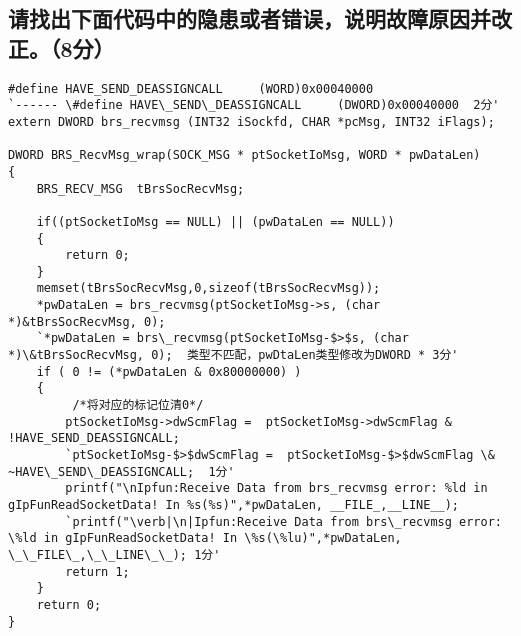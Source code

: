 ﻿\documentclass  [11pt,onecolumn,a4paper]{article}
\begin{document}
\subsection{请找出下面代码中的隐患或者错误，说明故障原因并改正。（8分）}
\begin{lstlisting}[escapeinside=`']
#define HAVE_SEND_DEASSIGNCALL     (WORD)0x00040000 
`------ \#define HAVE\_SEND\_DEASSIGNCALL     (DWORD)0x00040000  2分'
extern DWORD brs_recvmsg (INT32 iSockfd, CHAR *pcMsg, INT32 iFlags);

DWORD BRS_RecvMsg_wrap(SOCK_MSG * ptSocketIoMsg, WORD * pwDataLen)
{
    BRS_RECV_MSG  tBrsSocRecvMsg;   

    if((ptSocketIoMsg == NULL) || (pwDataLen == NULL))
    {
        return 0;
    } 
    memset(tBrsSocRecvMsg,0,sizeof(tBrsSocRecvMsg));
    *pwDataLen = brs_recvmsg(ptSocketIoMsg->s, (char *)&tBrsSocRecvMsg, 0);
    `*pwDataLen = brs\_recvmsg(ptSocketIoMsg-$>$s, (char *)\&tBrsSocRecvMsg, 0);  类型不匹配，pwDtaLen类型修改为DWORD * 3分'
    if ( 0 != (*pwDataLen & 0x80000000) )
    {
         /*将对应的标记位清0*/
        ptSocketIoMsg->dwScmFlag =  ptSocketIoMsg->dwScmFlag & !HAVE_SEND_DEASSIGNCALL;  
        `ptSocketIoMsg-$>$dwScmFlag =  ptSocketIoMsg-$>$dwScmFlag \& ~HAVE\_SEND\_DEASSIGNCALL;  1分'
        printf("\nIpfun:Receive Data from brs_recvmsg error: %ld in gIpFunReadSocketData! In %s(%s)",*pwDataLen, __FILE_,__LINE__);
        `printf("\verb|\n|Ipfun:Receive Data from brs\_recvmsg error: \%ld in gIpFunReadSocketData! In \%s(\%lu)",*pwDataLen, \_\_FILE\_,\_\_LINE\_\_); 1分'
        return 1;
    }
    return 0;
}
\end{lstlisting}
\end{document}
